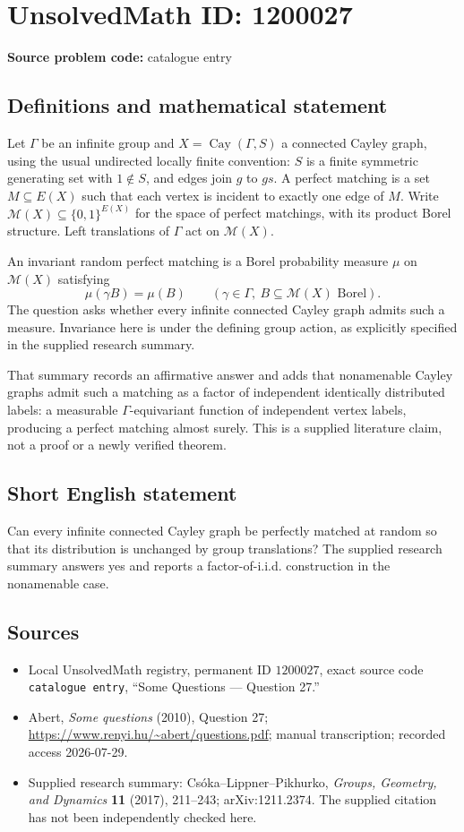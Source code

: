 \documentclass[11pt]{article}
\begin{document}
\section*{UnsolvedMath ID: 1200027}
\textbf{Source problem code:} catalogue entry
\subsection{Definitions and mathematical statement}
Let \(\Gamma\) be an infinite group and \(X=\operatorname{Cay}(\Gamma,S)\) a connected Cayley graph, using the usual undirected locally finite convention: \(S\) is a finite symmetric generating set with \(1\notin S\), and edges join \(g\) to \(gs\). A perfect matching is a set \(M\subseteq E(X)\) such that each vertex is incident to exactly one edge of \(M\). Write \(\mathcal M(X)\subseteq\{0,1\}^{E(X)}\) for the space of perfect matchings, with its product Borel structure. Left translations of \(\Gamma\) act on \(\mathcal M(X)\).

An invariant random perfect matching is a Borel probability measure \(\mu\) on \(\mathcal M(X)\) satisfying
\[
\mu(\gamma B)=\mu(B)\qquad
(\gamma\in\Gamma,\ B\subseteq\mathcal M(X)\text{ Borel}).
\]
The question asks whether every infinite connected Cayley graph admits such a measure. Invariance here is under the defining group action, as explicitly specified in the supplied research summary.

That summary records an affirmative answer and adds that nonamenable Cayley graphs admit such a matching as a factor of independent identically distributed labels: a measurable \(\Gamma\)-equivariant function of independent vertex labels, producing a perfect matching almost surely. This is a supplied literature claim, not a proof or a newly verified theorem.
\subsection{Short English statement}
Can every infinite connected Cayley graph be perfectly matched at random so that its distribution is unchanged by group translations? The supplied research summary answers yes and reports a factor-of-i.i.d. construction in the nonamenable case.
\subsection{Sources}
\begin{itemize}
\item Local UnsolvedMath registry, permanent ID \(1200027\), exact source code \texttt{catalogue entry}, ``Some Questions --- Question 27.''
\item Abert, \emph{Some questions} (2010), Question 27; \url{https://www.renyi.hu/~abert/questions.pdf}; manual transcription; recorded access 2026-07-29.
\item Supplied research summary: Cs\'oka--Lippner--Pikhurko, \emph{Groups, Geometry, and Dynamics} \textbf{11} (2017), 211--243; arXiv:1211.2374. The supplied citation has not been independently checked here.
\end{itemize}
\end{document}
